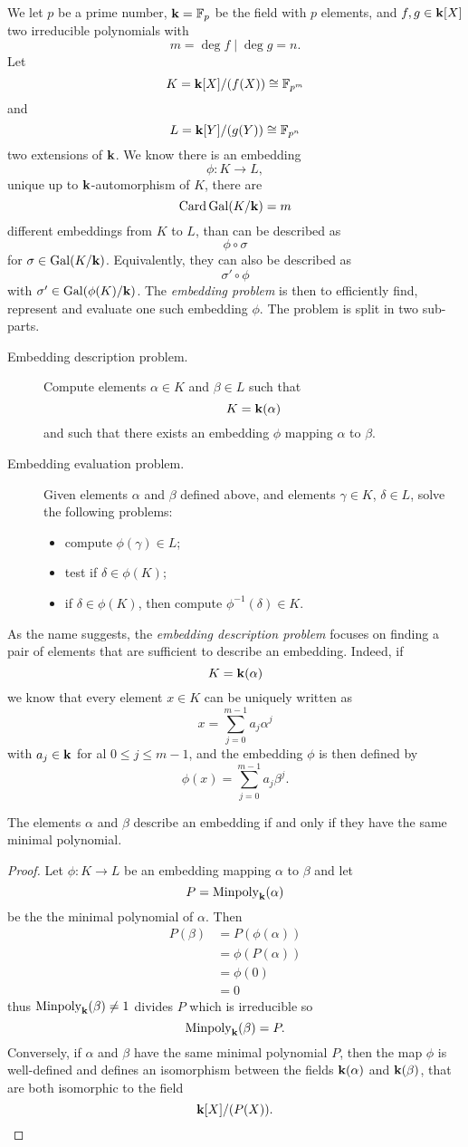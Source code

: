 We let $p$ be a prime number, $\mathbf{k} = \mathbb{F}_p$ be the field with $p$ elements,
and $f, g\in\mathbf{k}[X]$ two irreducible polynomials with
\[
  m=\deg f\mid\deg g=n.
\]
Let
\[
  K=\mathbf{k}[X]/(f(X))\cong\mathbb{F}_{p^m}
\]
and
\[
  L = \mathbf{k}[Y]/(g(Y))\cong\mathbb{F}_{p^n}
\]
two extensions of $\mathbf{k}$. We know there is an embedding
\[
  \phi:K\to L,
\]
unique up to $\mathbf{k}$-automorphism of $K$, \ie there are
\[
  \operatorname{Card}\operatorname{Gal}(K/\mathbf{k})=m
\]
different embeddings from $K$ to $L$, than can be described as
\[
  \phi\circ\sigma
\]
for $\sigma\in\operatorname{Gal}(K/\mathbf{k})$. Equivalently, they can also be described as
\[
  \sigma'\circ\phi
\]
with $\sigma'\in\operatorname{Gal}(\phi(K)/\mathbf{k})$. The \emph{embedding problem} is then to
efficiently find, represent and evaluate one such embedding $\phi$. The problem
is split in two sub-parts.
\begin{description}
  \item[Embedding description problem.] Compute elements $\alpha\in K$ and
    $\beta\in L$ such that 
    \[
      K=\mathbf{k}(\alpha)
    \]
    and such that there exists an embedding $\phi$ mapping $\alpha$ to $\beta$.
  \item[Embedding evaluation problem.] Given elements $\alpha$ and $\beta$
    defined above, and elements $\gamma\in K$, $\delta\in L$, solve the
    following problems:
    \begin{itemize}
      \item compute $\phi(\gamma)\in L$;
      \item test if $\delta\in\phi(K)$;
      \item if $\delta\in\phi(K)$, then compute $\phi^{-1}(\delta)\in K$.
    \end{itemize}
\end{description}
As the name suggests, the \emph{embedding description problem} focuses on
finding a pair of elements that are sufficient to describe an embedding. Indeed,
if 
\[
  K=\mathbf{k}(\alpha)
\]
we know that every element $x\in K$ can be uniquely written as 
\[
  x = \sum_{j=0}^{m-1}a_j\alpha^j
\]
with $a_j\in\mathbf{k}$ for al $0\leq j\leq m-1$, and the embedding $\phi$ is then
defined by
\[
  \phi(x) = \sum_{j=0}^{m-1}a_j\beta^j.
\]
\begin{prop}
  \label{prop:description}
 The elements $\alpha$ and $\beta$
 describe an embedding if and only if they have the same minimal polynomial. 
\end{prop}
\begin{proof}
  Let $\phi:K\to L$ be an embedding mapping $\alpha$ to $\beta$ and let 
  \[
    P = \operatorname{Minpoly}_{\mathbf{k}}(\alpha)
  \]
  be the the minimal polynomial of $\alpha$. Then 
  \begin{align*}
    P(\beta) &= P(\phi(\alpha)) \\
    &= \phi(P(\alpha))\\
    &= \phi(0) \\
    &= 0
  \end{align*}
  thus $\operatorname{Minpoly}_{\mathbf{k}}(\beta)\neq 1$ divides $P$ which is irreducible so 
  \[
\operatorname{Minpoly}_{\mathbf{k}}(\beta) = P.
  \]
 Conversely, if $\alpha$ and $\beta$ have the same minimal polynomial $P$, then the
 map $\phi$ is well-defined and defines an isomorphism between the fields $\mathbf{k}(\alpha)$ and
 $\mathbf{k}(\beta)$, that are both isomorphic to the field
 \[
   \mathbf{k}[X]/(P(X)).
 \]
\end{proof}
